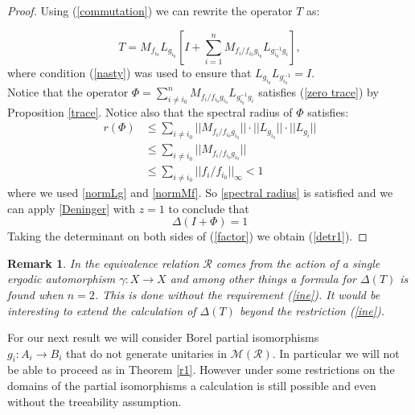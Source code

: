 \documentclass[12pt]{amsart}
\newtheorem{remark}[teo]{Remark}
\numberwithin{equation}{section}
\begin{document}
\begin{proof}
Using (\ref{commutation}) we can rewrite the operator $T$ as:

\begin{equation}\label{factor}
T=M_{f_{i_0}}L_{g_{i_0}}\left[I+\sum_{i=1}^n M_{f_i/f_{i_0}g_{i_0}} L_{g_{i_0}^{-1}g_i} \right],
\end{equation}
where condition (\ref{nasty}) was used to ensure that $L_{g_{i_0}}L_{{g^{-1}_{i_0}}}=I$.\\
Notice that the operator $\Phi=\sum_{i \neq i_0}^n M_{f_i/f_{i_0}g_{i_0}} L_{g_{i_0}^{-1}g_i}$  satisfies (\ref{zero trace}) by Proposition \ref{trace}. Notice also that the spectral radius of $\Phi$ satisfies:
\begin{align*}
r(\Phi) &\leqslant \sum_{i \neq i_0} ||M_{f_i/f_{i_0}g_{i_0}}||\cdot ||L_{g_{i_0}}||\cdot ||L_{g_i}||\\
        &\leqslant  \sum_{i \neq i_0}||M_{f_i/f_{i_0}g_{i_0}}||\\
        & \leqslant \sum_{i \neq i_0} || f_i/f_{i_0}||_{\infty}<1
\end{align*}
where we used \ref{normLg} and \ref{normMf}. So \ref{spectral radius} is satisfied and we can apply \ref{Deninger} with $z=1$ to conclude that
\[
\Delta(I+\Phi) =1
\]
Taking the determinant on both sides of (\ref{factor}) we obtain (\ref{detr1}).
\end{proof}
\begin{remark}
In \cite{Den1} the equivalence relation $\mathcal{R}$ comes from the action of a single ergodic automorphism $\gamma:X\rightarrow X$ and among other things a formula for $\Delta(T)$ is found when $n=2$. This is done without the requirement (\ref{ine}). It would be interesting to extend the calculation of $\Delta(T)$ beyond the restriction (\ref{ine}).
\end{remark}
\noindent For our next result we will consider Borel partial isomorphisms \\
$g_i:A_i\rightarrow B_i$ that do not generate unitaries in $\mathcal{M(R)}$. In particular we will not be able to proceed as in Theorem \ref{r1}. However under some restrictions on the domains of the partial isomorphisms a calculation is still possible and even without the treeability assumption.
\end{document}
